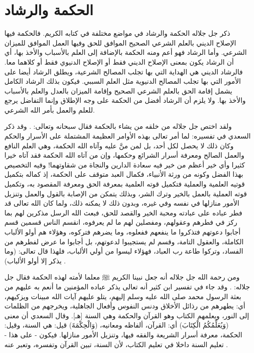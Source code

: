 \section{الحكمة والرشاد}

ذكر جل جلاله الحكمة والرشاد في مواضع مختلفة في كتابه الكريم. فالحكمة فيها الإصلاح الديني بالعلم الشرعي الصحيح الموافق للحق وفيها العمل الموافق للميزان الشرعي. وأما الرشاد فهو أعم ومنه الحكمة بالإضافة إلى العلم بالأسباب والأخذ بها، أي أن الرشاد يكون بمعنى الإصلاح الديني فقط أو الإصلاح الدنيوي فقط أو كلاهما معا. فالرشاد الديني هي الهداية التي بها تجلب المصالح الشرعية، ويطلق الرشاد أيضا على الأمور التي بها تجلب المصالح الدنيوية مثل العلم السببي. فيكون بذلك الرشاد الكامل يشمل إقامة الحق بالعلم الشرعي الصحيح وإقامة الميزان بالعدل والعلم بالأسباب والأخذ بها. ولا يلزم أن الرشاد أفضل من الحكمة على وجه الإطلاق وإنما التفاضل يرجع للعلم والعمل بأمر الله الشرعي.

ولقد اختص جل جلاله من خلقه من يشاء بالحكمة فقال سبحانه وتعالى: 
\quranayah*[2][269]{\footnotesize \surahname*[2]}. وقد ذكر السعدي في تفسيره: 
لما أمر تعالى بهذه الأوامر العظيمة المشتملة على الأسرار والحكم وكان ذلك لا يحصل لكل أحد، بل لمن منَّ عليه وآتاه الله الحكمة، وهي العلم النافع والعمل الصالح ومعرفة أسرار الشرائع وحكمها، وإن من آتاه الله الحكمة فقد آتاه خيرا كثيرا وأي خير أعظم من خير فيه سعادة الدارين والنجاة من شقاوتهما! وفيه التخصيص بهذا الفضل وكونه من ورثة الأنبياء، فكمال العبد متوقف على الحكمة، إذ كماله بتكميل قوتيه العلمية والعملية فتكميل قوته العلمية بمعرفة الحق ومعرفة المقصود به، وتكميل قوته العملية بالعمل بالخير وترك الشر، وبذلك يتمكن من الإصابة بالقول والعمل وتنزيل الأمور منازلها في نفسه وفي غيره، وبدون ذلك لا يمكنه ذلك، ولما كان الله تعالى قد فطر عباده على عبادته ومحبة الخير والقصد للحق، فبعث الله الرسل مذكرين لهم بما ركز في فطرهم وعقولهم، ومفصلين لهم ما لم يعرفوه، انقسم الناس قسمين قسم أجابوا دعوتهم فتذكروا ما ينفعهم ففعلوه، وما يضرهم فتركوه، وهؤلاء هم أولو الألباب الكاملة، والعقول التامة، وقسم لم يستجيبوا لدعوتهم، بل أجابوا ما عرض لفطرهم من الفساد، وتركوا طاعة رب العباد، فهؤلاء ليسوا من أولي الألباب، فلهذا قال تعالى: (وما يذكر إلا أولو الألباب) \cite{tafsir_Saadi}.

ومن رحمة الله جل جلاله أنه جعل نبينا الكريم ﷺ معلما لأمته لهذه الحكمة فقال جل جلاله: 
\quranayah*[2][151]{\footnotesize \surahname*[2]}. وقد جاء في تفسير ابن كثير أنه تعالى يذكر عباده المؤمنين ما أنعم به عليهم من بعثة الرسول محمد صلى الله عليه وسلم إليهم، يتلو عليهم آيات الله مبينات ويزكيهم، أي: يطهرهم من رذائل الأخلاق ودنس النفوس وأفعال الجاهلية، ويخرجهم من الظلمات إلى النور، ويعلمهم الكتاب وهو القرآن والحكمة وهي السنة [هـ]. وقال السعدي أن معنى (وَيُعَلِّمُكُمُ الْكِتَابَ) أي: القرآن، ألفاظه ومعانيه، (وَالْحِكْمَةَ) قيل: هي السنة، وقيل: الحكمة، معرفة أسرار الشريعة والفقه فيها، وتنزيل الأمور منازلها. فيكون - على هذا - تعليم السنة داخلا في تعليم الكتاب، لأن السنة، تبين القرآن وتفسره، وتعبر عنه \cite{tafsir_Saadi}.

